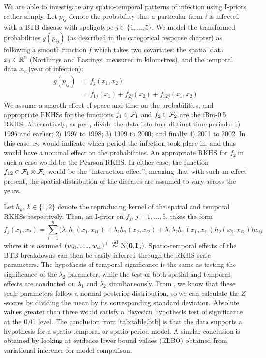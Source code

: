 \documentclass[a4paper,showframe,11pt]{report}\usepackage[]{graphicx}\usepackage[]{color}
\begin{document}
We are able to investigate any spatio-temporal patterns of infection using I-priors rather simply.
Let $p_{ij}$ denote the probability that a particular farm $i$ is infected with a BTB disease with spoligotype $j \in \{1,\dots,5\}$.
We model the transformed probabilities $g(p_{ij})$ (as described in the categorical response chapter) as following a smooth function $f$ which takes two covariates: the spatial data $x_1 \in \mathbb{R}^2$ (Northings and Eastings, measured in kilometres), and the temporal data $x_2$ (year of infection):
\begin{align*}
  g(p_{ij}) &= f_j(x_1, x_2) \\
  &= f_{1j}(x_1) + f_{2j}(x_2) + f_{12j}(x_1, x_2)
\end{align*}
We assume a smooth effect of space and time on the probabilities, and appropriate RKHSs for the functions $f_1 \in {\mathcal F}_1$ and $f_2 \in {\mathcal F}_2$ are the fBm-0.5 RKHS.
Alternatively, as per \citet{diggle2005nonparametric}, divide the data into four distinct time periods:
1) 1996 and earlier;
2) 1997 to 1998;
3) 1999 to 2000;
and finally 4) 2001 to 2002.
In this case, $x_2$ would indicate which period the infection took place in, and thus would have a nominal effect on the probabilities.
An appropriate RKHS for $f_2$ in such a case would be the Pearson RKHS.
In either case, the function $f_{12} \in {\mathcal F}_1 \otimes {\mathcal F}_2$ would be the ``interaction effect'', meaning that with such an effect present, the spatial distribution of the diseases are assumed to vary across the years.


Let $h_k$, $k \in \{1,2\}$ denote the reproducing kernel of the spatial and temporal RKHSs respectively.
Then, an I-prior on $f_j$, $j=1,\dots,5$, takes the form
\[
  f_j(x_1,x_2) = \sum_{i=1}^n \big(
  \lambda_1 h_1(x_1, x_{i1}) + \lambda_2 h_2(x_2, x_{i2}) +
  \lambda_1\lambda_2 h_1(x_1, x_{i1}) h_2(x_2, x_{i2})
  \big)w_{ij}
\]
where it is assumed $(w_{i1},\dots,w_{i5})^\top \,\overset{\text{iid}}{\sim}\, \operatorname{N}({\mathbf 0},{\mathbf I}_5)$.
Spatio-temporal effects of the BTB breakdowns can then be easily inferred through the RKHS scale parameters.
The hypothesis of temporal significance is the same as testing the significance of the $\lambda_2$ parameter, while the test of both spatial and temporal effects are conducted on $\lambda_1$ and $\lambda_2$ simultaneously.
From , we know that these scale parameters follow a normal posterior distribution, so we can calculate the $Z$-scores by dividing the mean by its corresponding standard deviation.
Absolute values greater than three would satisfy a Bayesian hypothesis test of significance at the 0.01 level.
The conclusion from \cref{tab:table.btb} is that the data supports a hypothesis for a spatio-temporal or spatio-period model.
A similar conclusion is obtained  by looking at evidence lower bound values (ELBO) obtained from variational inference for model comparison.
\end{document}
